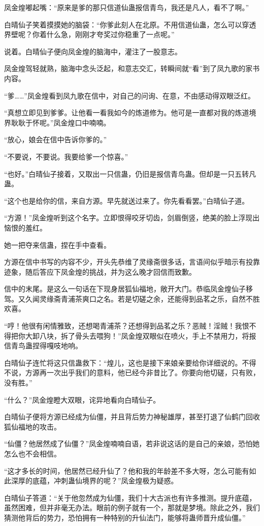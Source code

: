 \begin{this_body}
凤金煌嘟起嘴：“原来是爹的那只信道仙蛊报信青鸟，我还是凡人，看不了啊。”

白晴仙子笑着摸摸她的脑袋：“你爹此刻人在北原。不用信道仙蛊，怎么可以穿透界壁呢？你着什么急，刚刚才夸奖过你稳重了一点呢。”

说着。白晴仙子便向凤金煌的脑海中，灌注了一股意志。

凤金煌驾轻就熟，脑海中念头泛起，和意志交汇，转瞬间就“看”到了凤九歌的家书内容。

“爹……”凤金煌看到凤九歌在信中，对自己的问询、在意，不由感动得双眼泛红。

“真想立即见到爹爹。让他看一看我如今的炼道修为。他可是一直都对我的炼道境界耿耿于怀呢。”凤金煌口中喃喃。

“放心，娘会在信中告诉你爹的。”

“不要说，不要说。我要给爹一个惊喜。”

“也好。”白晴仙子接着，又取出一只信蛊，仍旧是报信青鸟蛊。但却是一只五转凡蛊。

“这个也是给你的信，来自方源。早先就送过来了。你先看看罢。”白晴仙子道。

“方源！”凤金煌听到这个名字。立即恨得咬牙切齿，剑眉倒竖，绝美的脸上浮现出恼恨的羞红。

她一把夺来信蛊，捏在手中查看。

方源在信中书写的内容不少，开头先恭维了灵缘斋很多话，言语间似乎暗示有投靠迹象，随后答应下凤金煌的挑战，并为这么晚才回信而致歉。

信中的末尾。是这么一句话在下现身居狐仙福地，敞开大门。恭临凤金煌仙子移驾。又久闻灵缘斋青浦茶爽口之名。若是切磋之余，还能得到品茗之乐，自然不胜欢喜。

“哼！他很有闲情雅致，还想喝青浦茶？还想得到品茗之乐？恶贼！淫贼！我恨不得把你大卸八块，拆了骨头去喂狗！”凤金煌双眼似在喷火，手上不禁用力，将报信青鸟蛊捏得嘎吱地响。

白晴仙子连忙将这只信蛊救下：“煌儿，这也是接下来娘亲要给你详细说的。不得不说，方源再一次出乎我们的意料，他已经今非昔比了。你要向他切磋，只有败，没有胜。”

“什么？”凤金煌瞪大双眼，诧异地看向白晴仙子。

白晴仙子便将方源已经成为仙僵，并且背后势力神秘雄厚，甚至打退了仙鹤门回收狐仙福地的攻击。

“仙僵？他居然成了仙僵？”凤金煌喃喃自语，若非说这话的是自己的亲娘，恐怕她怎么也不会相信。

“这才多长的时间，他居然已经升仙了？他和我的年龄差不多大呀，怎么可能有如此深厚的底蕴，冲刺蛊仙境界的呢？”凤金煌极为疑惑。

白晴仙子答道：“关于他忽然成为仙僵，我们十大古派也有许多推测。提升底蕴，虽然困难，但并非毫无办法。眼前的例子就有一个，那就是梦境。除此之外，我们猜测他背后的势力，恐怕拥有一种特别的升仙法门，能够将蛊师晋升成仙僵。”


\end{this_body}
